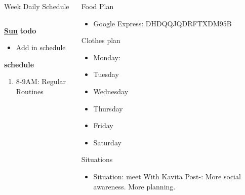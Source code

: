\begin{frame}
\begin{columns}
\begin{column}{0.5\linewidth}
\begin{block}{Week Daily Schedule}
\begin{columns}
          \begin{column}{0.15\textwidth}{\small \underline{\bf Sun}}
            {\small {\bf todo}}\\ 
            \begin{itemize}
              \tiny \item \tiny Add in schedule
            \end{itemize} 
                {\small {\bf schedule}}\\
                \begin{enumerate} 
                  \tiny \item \tiny 8-9AM: Regular Routines 
                \end{enumerate}
          \end{column}

        \end{columns}
      \end{block}
    \end{column}
    
    \begin{column}{0.25\linewidth}
      \begin{block}{Food Plan} 
        \begin{itemize}
          \tiny \item \tiny Google Express: DHDQQJQDRFTXDM95B
        \end{itemize}
      \end{block} 
      \begin{block}{Clothes plan} 
        \begin{itemize}
          \tiny \item \tiny Monday: 
        \item \tiny Tuesday
        \item \tiny Wednesday
        \item \tiny Thursday
        \item \tiny Friday
        \item \tiny Saturday
        \end{itemize} 
      \end{block} 
      
      \begin{block}{Situations}
        \begin{itemize}
          \tiny \item \tiny Situation: meet With Kavita  Post-: More
          social awareness. More planning.
        \end{itemize}
      \end{block}

    \end{column} 
  \end{columns}  
\end{frame}
